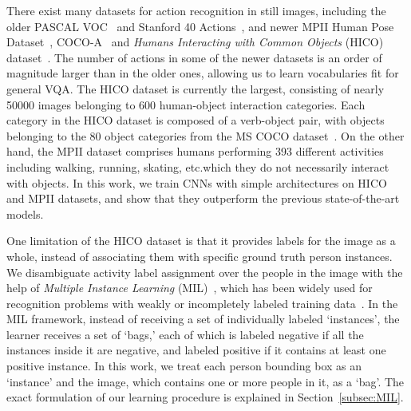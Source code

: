 \documentclass[runningheads]{llncs}
\begin{document}
There exist many datasets for action recognition in still images, including the older PASCAL VOC~\cite{everingham2010pascal} and Stanford 40 Actions~\cite{yao2011human}, and newer MPII Human Pose Dataset~\cite{pishchulin2014fine}, COCO-A~\cite{ronchi2015COCOA} and \emph{Humans Interacting with Common Objects} (HICO) dataset~\cite{chao2015hico}. The number of actions in some of the newer datasets is an order of magnitude larger than in the older ones, allowing us to learn vocabularies fit for general VQA. The HICO dataset is currently the largest, consisting of nearly 50000 images belonging to 600 human-object interaction categories. Each category in the HICO dataset is composed of a verb-object pair, with objects belonging to the 80 object categories from the MS COCO dataset~\cite{lin2014microsoft}. On the other hand, the MPII dataset comprises humans performing 393 different activities including walking, running, skating, etc.\in which they do not necessarily interact with objects. In this work, we train CNNs with simple architectures on HICO and MPII datasets, and show that they outperform the previous state-of-the-art models.

One limitation of the HICO dataset is that it provides labels for the image as a whole, instead of associating them with specific ground truth person instances. We disambiguate activity label assignment over the people in the image with the help of \emph{Multiple Instance Learning} (MIL)~\cite{maron1998MIL}, which has been widely used for recognition problems with weakly or incompletely labeled training data~\cite{zhang2005multiple,hoffman2015detector,vezhnevets2010towards,pinheiro2015image}. In the MIL framework, instead of receiving a set of individually labeled `instances', the learner receives a set of `bags,' each of which is labeled negative if all the instances inside it are negative, and labeled positive if it contains at least one positive instance. In this work, we treat each person bounding box as an `instance' and the image, which contains one or more people in it, as a `bag'. The exact formulation of our learning procedure is explained in Section~\ref{subsec:MIL}.
\end{document}
